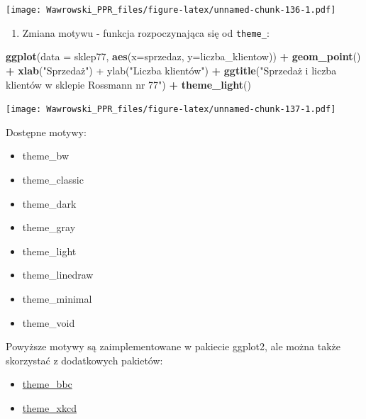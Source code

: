 \documentclass[]{book}
\newenvironment{Shaded}{\begin{snugshade}}{\end{snugshade}}
\newcommand{\KeywordTok}[1]{\textcolor[rgb]{0.13,0.29,0.53}{\textbf{#1}}}
\newcommand{\DataTypeTok}[1]{\textcolor[rgb]{0.13,0.29,0.53}{#1}}
\newcommand{\StringTok}[1]{\textcolor[rgb]{0.31,0.60,0.02}{#1}}
\newcommand{\OperatorTok}[1]{\textcolor[rgb]{0.81,0.36,0.00}{\textbf{#1}}}
\newcommand{\NormalTok}[1]{#1}
\providecommand{\tightlist}{%
  \setlength{\itemsep}{0pt}\setlength{\parskip}{0pt}}
\begin{document}
\texttt{[image: Wawrowski\_PPR\_files/figure-latex/unnamed-chunk-136-1.pdf]}

\begin{enumerate}
\def\labelenumi{\arabic{enumi}.}
\setcounter{enumi}{4}
\tightlist
\item
  Zmiana motywu - funkcja rozpoczynająca się od \texttt{theme\_}:
\end{enumerate}

\begin{Shaded}
\begin{Highlighting}[]
\KeywordTok{ggplot}\NormalTok{(}\DataTypeTok{data =}\NormalTok{ sklep77, }\KeywordTok{aes}\NormalTok{(}\DataTypeTok{x=}\NormalTok{sprzedaz, }\DataTypeTok{y=}\NormalTok{liczba_klientow)) }\OperatorTok{+}
\StringTok{  }\KeywordTok{geom_point}\NormalTok{() }\OperatorTok{+}
\StringTok{  }\KeywordTok{xlab}\NormalTok{(}\StringTok{"Sprzedaż") +}
\StringTok{  ylab("}\NormalTok{Liczba klientów") }\OperatorTok{+}
\StringTok{  }\KeywordTok{ggtitle}\NormalTok{(}\StringTok{"Sprzedaż i liczba klientów w sklepie Rossmann nr 77"}\NormalTok{) }\OperatorTok{+}
\StringTok{  }\KeywordTok{theme_light}\NormalTok{()}
\end{Highlighting}
\end{Shaded}

\texttt{[image: Wawrowski\_PPR\_files/figure-latex/unnamed-chunk-137-1.pdf]}

Dostępne motywy:

\begin{itemize}
\tightlist
\item
  theme\_bw
\item
  theme\_classic
\item
  theme\_dark
\item
  theme\_gray
\item
  theme\_light
\item
  theme\_linedraw
\item
  theme\_minimal
\item
  theme\_void
\end{itemize}

Powyższe motywy są zaimplementowane w pakiecie ggplot2, ale można także
skorzystać z dodatkowych pakietów:

\begin{itemize}
\tightlist
\item
  \href{https://github.com/bbc/bbplot}{theme\_bbc}
\item
  \href{https://cran.r-project.org/web/packages/xkcd/}{theme\_xkcd}
\end{itemize}
\end{document}
